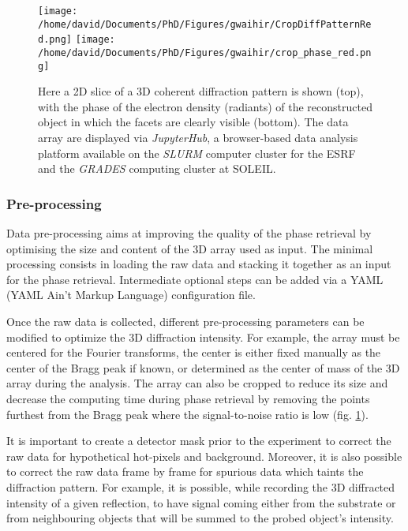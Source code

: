 \begin{figure}[!htb]
    \centering
    \texttt{[image: /home/david/Documents/PhD/Figures/gwaihir/CropDiffPatternRed.png]}
    \texttt{[image: /home/david/Documents/PhD/Figures/gwaihir/crop\_phase\_red.png]}
    \caption{
    Here a 2D slice of a 3D coherent diffraction pattern is shown (top), with the phase of the electron density (radiants) of the reconstructed object in which the facets are clearly visible (bottom). The data array are displayed via \textit{JupyterHub}, a browser-based data analysis platform available on the \textit{SLURM} computer cluster for the ESRF and the \textit{GRADES} computing cluster at SOLEIL.
    }
    \label{fig:GUI_file}
\end{figure}

\subsubsection{Pre-processing}

Data pre-processing aims at improving the quality of the phase retrieval by optimising the size and content of the 3D array used as input.
The minimal processing consists in loading the raw data and stacking it together as an input for the phase retrieval.
Intermediate optional steps can be added via a YAML (YAML Ain't Markup Language) configuration file.

Once the raw data is collected, different pre-processing parameters can be modified to optimize the 3D diffraction intensity.
For example, the array must be centered for the Fourier transforms, the center is either fixed manually as the center of the Bragg peak if known, or determined as the center of mass of the 3D array during the analysis.
The array can also be cropped to reduce its size and decrease the computing time during phase retrieval by removing the points furthest from the Bragg peak where the signal-to-noise ratio is low (fig. \ref{fig:GUI_file}).

It is important to create a detector mask prior to the experiment to correct the raw data for hypothetical hot-pixels and background.
Moreover, it is also possible to correct the raw data frame by frame for spurious data which taints the diffraction pattern.
For example, it is possible, while recording the 3D diffracted intensity of a given reflection, to have signal coming either from the substrate or from neighbouring objects that will be summed to the probed object's intensity.

